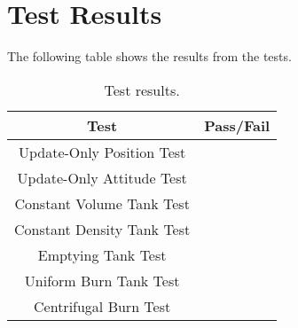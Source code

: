 \section{Test Results}

The following table shows the results from the tests.

\begin{table}[H]
	\caption{Test results.}
	\label{tab:results}
	\centering \fontsize{10}{10}\selectfont
	\begin{tabular}{c | c } %
		\hline
		\textbf{Test} 				    & \textbf{Pass/Fail}  \\ \hline
		Update-Only Position Test  &  \\
		Update-Only Attitude Test  &    \\ 
		Constant Volume Tank Test  &   \\ 
		Constant Density Tank Test &   \\ 
		Emptying Tank Test &   \\ 
		Uniform Burn Tank Test  &   \\ 
		Centrifugal Burn Test &   \\ \hline
	\end{tabular}
\end{table}